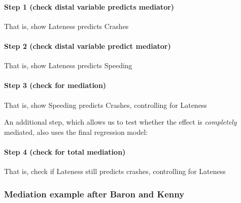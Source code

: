 \documentclass[]{article}
\let\oldparagraph\paragraph
\renewcommand{\paragraph}[1]{\oldparagraph{#1}\mbox{}}
\begin{document}
\hypertarget{step-1-check-distal-variable-predicts-mediator}{%
\paragraph{Step 1 (check distal variable predicts mediator)}\label{step-1-check-distal-variable-predicts-mediator}}

That is, show Lateness predicts Crashes

\hypertarget{step-2-check-distal-variable-predict-mediator}{%
\paragraph{Step 2 (check distal variable predict mediator)}\label{step-2-check-distal-variable-predict-mediator}}

That is, show Lateness predicts Speeding

\hypertarget{step-3-check-for-mediation}{%
\paragraph{Step 3 (check for mediation)}\label{step-3-check-for-mediation}}

That is, show Speeding predicts Crashes, controlling for Lateness

An additional step, which allows us to test whether the effect is \emph{completely}
mediated, also uses the final regression model:

\hypertarget{step-4-check-for-total-mediation}{%
\paragraph{Step 4 (check for total mediation)}\label{step-4-check-for-total-mediation}}

That is, check if Lateness still predicts crashes, controlling for Lateness

\hypertarget{mediation-example-after-baron-and-kenny}{%
\subsubsection*{Mediation example after Baron and Kenny}\label{mediation-example-after-baron-and-kenny}}
\end{document}

